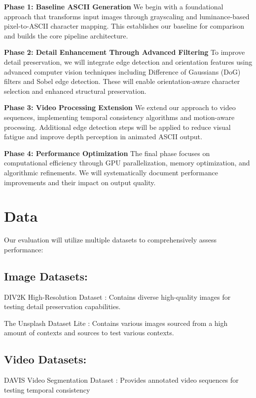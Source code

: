 \documentclass[10pt,twocolumn,letterpaper]{article}
\begin{document}
\textbf{Phase 1: Baseline ASCII Generation}
We begin with a foundational approach that transforms input images through grayscaling and luminance-based pixel-to-ASCII character mapping. This establishes our baseline for comparison and builds the core pipeline architecture.

\textbf{Phase 2: Detail Enhancement Through Advanced Filtering}
To improve detail preservation, we will integrate edge detection and orientation features using advanced computer vision techniques including Difference of Gaussians (DoG) filters and Sobel edge detection. These will enable orientation-aware character selection and enhanced structural preservation.

\textbf{Phase 3: Video Processing Extension}
We extend our approach to video sequences, implementing temporal consistency algorithms and motion-aware processing. Additional edge detection steps will be applied to reduce visual fatigue and improve depth perception in animated ASCII output.

\textbf{Phase 4: Performance Optimization}
The final phase focuses on computational efficiency through GPU parallelization, memory optimization, and algorithmic refinements. We will systematically document performance improvements and their impact on output quality.

\section{Data}

Our evaluation will utilize multiple datasets to comprehensively assess performance:

\subsection{Image Datasets:}

DIV2K High-Resolution Dataset \cite{div2k}: Contains diverse high-quality images for testing detail preservation capabilities.

The Unsplash Dataset Lite \cite{unsplash}: Contains various images sourced from a high amount of contexts and sources to test various contexts.

\subsection{Video Datasets:}
DAVIS Video Segmentation Dataset \cite{davis2017}: Provides annotated video sequences for testing temporal consistency
\end{document}
